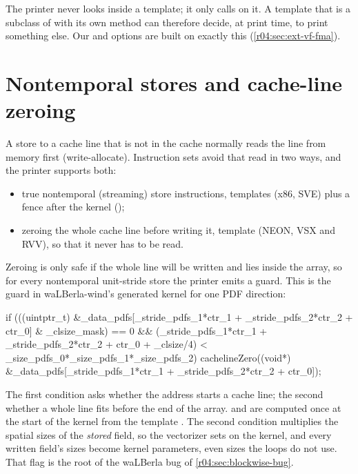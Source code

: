 \begin{keyidea}
  The printer never looks inside a template; it only calls  on it. A
  template that is a subclass of  with its own  method can
  therefore decide, at print time, to print something else. Our  and
   options are built on exactly this (\cref{r04:sec:ext-vf-fma}).
\end{keyidea}

\section{Nontemporal stores and cache-line zeroing}\label{r04:sec:nontemporal}

A store to a cache line that is not in the cache normally reads the line from memory
first (write-allocate). Instruction sets avoid that read in two ways, and the printer
supports both:
\begin{itemize}
  \item true nontemporal (streaming) store instructions, templates 
    (x86, SVE) plus a fence after the kernel ();
  \item zeroing the whole cache line before writing it, template 
    (NEON, VSX and RVV), so that it never has to be read.
\end{itemize}
Zeroing is only safe if the whole line will be written and lies inside the array, so
for every nontemporal unit-stride store the printer emits a guard. This is the guard in
waLBerla-wind's generated kernel for one PDF direction:
\begin{ccode}
if (((uintptr_t) &_data_pdfs[_stride_pdfs_1*ctr_1 + _stride_pdfs_2*ctr_2 + ctr_0] & _clsize_mask) == 0
    && (_stride_pdfs_1*ctr_1 + _stride_pdfs_2*ctr_2 + ctr_0 + _clsize/4) < _size_pdfs_0*_size_pdfs_1*_size_pdfs_2) {
    cachelineZero((void*) &_data_pdfs[_stride_pdfs_1*ctr_1 + _stride_pdfs_2*ctr_2 + ctr_0]);
}
\end{ccode}
The first condition asks whether the address starts a cache line; the second whether a
whole line fits before the end of the array.  and  are
computed once at the start of the kernel from the template . The
second condition multiplies the spatial sizes of the \emph{stored} field, so the
vectorizer sets  on the kernel, and every written
field's sizes become kernel parameters, even sizes the loops do not use. That flag is
the root of the waLBerla bug of \cref{r04:sec:blockwise-bug}.

